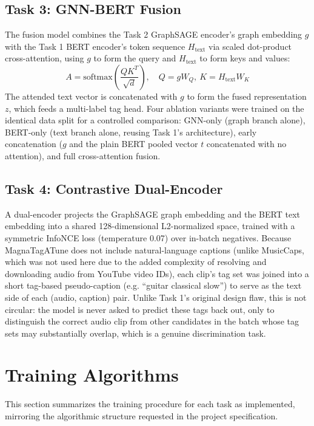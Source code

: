 \documentclass[conference]{IEEEtran}
\begin{document}
\subsection{Task 3: GNN-BERT Fusion}
The fusion model combines the Task 2 GraphSAGE encoder's graph embedding $g$ with the Task 1 BERT encoder's token sequence $H_{\text{text}}$ via scaled dot-product cross-attention, using $g$ to form the query and $H_{\text{text}}$ to form keys and values:
\begin{equation}
A = \text{softmax}\!\left(\frac{QK^T}{\sqrt{d}}\right), \quad Q = gW_Q,\ K = H_{\text{text}}W_K
\end{equation}
The attended text vector is concatenated with $g$ to form the fused representation $z$, which feeds a multi-label tag head. Four ablation variants were trained on the identical data split for a controlled comparison: GNN-only (graph branch alone), BERT-only (text branch alone, reusing Task 1's architecture), early concatenation ($g$ and the plain BERT pooled vector $t$ concatenated with no attention), and full cross-attention fusion.

\subsection{Task 4: Contrastive Dual-Encoder}
A dual-encoder projects the GraphSAGE graph embedding and the BERT text embedding into a shared 128-dimensional L2-normalized space, trained with a symmetric InfoNCE loss (temperature 0.07) over in-batch negatives. Because MagnaTagATune does not include natural-language captions (unlike MusicCaps, which was not used here due to the added complexity of resolving and downloading audio from YouTube video IDs), each clip's tag set was joined into a short tag-based pseudo-caption (e.g. ``guitar classical slow'') to serve as the text side of each (audio, caption) pair. Unlike Task 1's original design flaw, this is not circular: the model is never asked to predict these tags back out, only to distinguish the correct audio clip from other candidates in the batch whose tag sets may substantially overlap, which is a genuine discrimination task.

\section{Training Algorithms}
This section summarizes the training procedure for each task as implemented, mirroring the algorithmic structure requested in the project specification.
\end{document}
